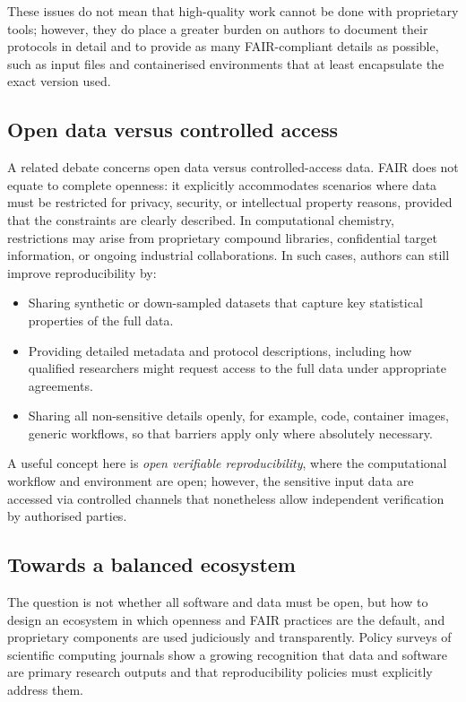 \documentclass[12pt]{article}
\begin{document}
These issues do not mean that high-quality work cannot be done with proprietary tools; however, they do place a greater burden on authors to document their protocols in detail and to provide as many FAIR-compliant details as possible, such as input files and containerised environments that at least encapsulate the exact version used\cite{CH12_rigorRepro2020,CH12_computationalReproGuide}.

\subsection{Open data versus controlled access}

A related debate concerns open data versus controlled-access data. FAIR does not equate to complete openness: it explicitly accommodates scenarios where data must be restricted for privacy, security, or intellectual property reasons, provided that the constraints are clearly described\cite{CH12_goFairPrinciples,CH12_nnlmFAIR}.  In computational chemistry, restrictions may arise from proprietary compound libraries, confidential target information, or ongoing industrial collaborations. In such cases, authors can still improve reproducibility by:

\begin{itemize}
  \item Sharing synthetic or down-sampled datasets that capture key statistical properties of the full data.
  \item Providing detailed metadata and protocol descriptions, including how qualified researchers might request access to the full data under appropriate agreements.
  \item Sharing all non-sensitive details openly, for example, code, container images, generic workflows, so that barriers apply only where absolutely necessary.
\end{itemize}

A useful concept here is \emph{open verifiable reproducibility}, where the computational workflow and environment are open; however, the sensitive input data are accessed via controlled channels that nonetheless allow independent verification by authorised parties\cite{CH12_computationalReproGuide}.

\subsection{Towards a balanced ecosystem}

The question is not whether all software and data must be open, but how to design an ecosystem in which openness and FAIR practices are the default, and proprietary components are used judiciously and transparently. Policy surveys of scientific computing journals show a growing recognition that data and software are primary research outputs and that reproducibility policies must explicitly address them\cite{CH12_frontiersRepro2025,CH12_rigorRepro2020}.
\end{document}

